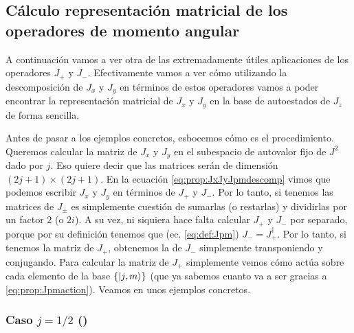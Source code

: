 \documentclass[10pt, a4paper]{article}
\numberwithin{equation}{subsection}
\begin{document}
\subsection{Cálculo representación matricial de los operadores de momento
    angular}

A continuación vamos a ver otra de las extremadamente útiles aplicaciones de
los operadores $J_+$ y $J_-$. Efectivamente vamos a ver cómo utilizando la
descomposición de $J_x$ y $J_y$ en términos de estos operadores vamos a poder
encontrar la representación matricial de $J_x$ y $J_y$ en la base de
autoestados de $J_z$ de forma sencilla.

\bigbreak

Antes de pasar a los ejemplos concretos, esbocemos cómo es el procedimiento.
Queremos calcular la matriz de $J_x$ y $J_y$ en el subespacio de autovalor fijo
de $J^2$ dado por $j$. Eso quiere decir que las matrices serán de
dimensión $(2j+1)\times(2j+1)$. En la ecuación \eqref{eq:prop:JxJyJpmdescomp}
vimos que podemos escribir $J_x$ y $J_y$ en términos de $J_+$ y $J_-$. Por lo
tanto, si tenemos las matrices de $J_\pm$ es simplemente cuestión de sumarlas
(o restarlas) y dividirlas por un factor $2$ (o $2i$). A su vez, ni siquiera
hace falta calcular $J_+$ y $J_-$ por separado, porque por su definición
tenemos que (ec. \eqref{eq:def:Jpm}) $J_- = J_+^\dagger$. Por lo tanto, si
tenemos la matriz de $J_+$, obtenemos la de $J_-$ simplemente transponiendo y
conjugando. Para calcular la matriz de $J_+$ simplemente vemos cómo actúa sobre
cada elemento de la base $\set{\ket{j,m}}$ (que ya sabemos cuanto va a ser
gracias a \eqref{eq:prop:Jpmaction}). Veamos en unos ejemplos concretos.

\subsubsection{Caso $j = 1/2$ (\spinhalf)}
\end{document}

